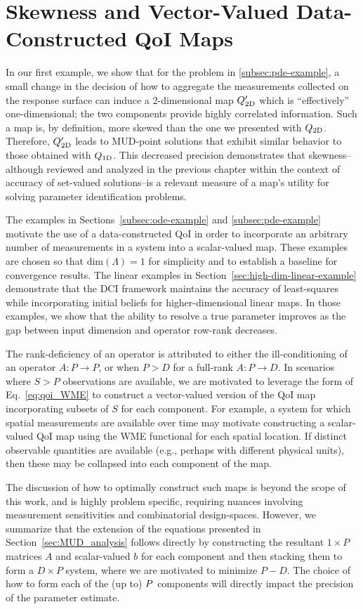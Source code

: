 \section{Skewness and Vector-Valued Data-Constructed QoI Maps}
In our first example, we show that for the problem in \ref{subsec:pde-example}, a small change in the decision of how to aggregate the measurements collected on the response surface can induce a 2-dimensional map $Q_\text{2D}^\prime$ which is ``effectively'' one-dimensional; the two components provide highly correlated information.
Such a map is, by definition, more skewed than the one we presented with $Q_\text{2D}$.
Therefore, $Q_\text{2D}^\prime$ leads to MUD-point solutions that exhibit similar behavior to those obtained with $Q_\text{1D}$.
This decreased precision demonstrates that skewness\---although reviewed and analyzed in the previous chapter within the context of accuracy of set-valued solutions\---is a relevant measure of a map's utility for solving parameter identification problems.

The examples in Sections~\ref{subsec:ode-example} and \ref{subsec:pde-example} motivate the use of a data-constructed QoI in order to incorporate an arbitrary number of measurements in a system into a scalar-valued map.
These examples are chosen so that $\text{dim}({\Lambda}) = 1$ for simplicity and to establish a baseline for convergence results.
The linear examples in Section~\ref{sec:high-dim-linear-example} demonstrate that the DCI framework maintains the accuracy of least-squares while incorporating initial beliefs for higher-dimensional linear maps.
In those examples, we show that the ability to resolve a true parameter improves as the gap between input dimension and operator row-rank decreases.

The rank-deficiency of an operator is attributed to either the ill-conditioning of an operator $A:P\to P$, or when $P>D$ for a full-rank $A:P\to D$.
In scenarios where $S>P$ observations are available, we are motivated to leverage the form of Eq.~\eqref{eq:qoi_WME} to construct a vector-valued version of the QoI map incorporating subsets of $S$ for each component.
For example, a system for which spatial measurements are available over time may motivate constructing a scalar-valued QoI map using the WME functional for each spatial location.
If distinct observable quantities are available (e.g., perhaps with different physical units), then these may be collapsed into each component of the map.

The discussion of how to optimally construct such maps is beyond the scope of this work, and is highly problem specific, requiring nuances involving measurement sensitivities and combinatorial design-spaces.
However, we summarize that the extension of the equations presented in Section~\ref{sec:MUD_analysis} follows directly by constructing the resultant $1\times P$ matrices $A$ and scalar-valued $b$ for each component and then stacking them to form a $D\times P$ system, where we are motivated to minimize $P-D$.
The choice of how to form each of the (up to) $P$ components will directly impact the precision of the parameter estimate.
